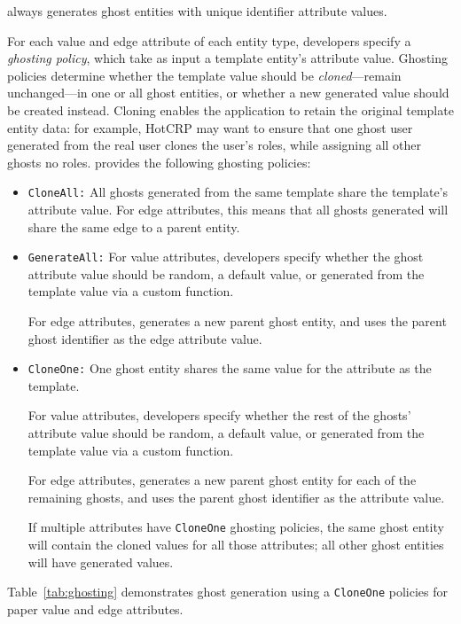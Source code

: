 \sys always generates ghost entities with unique identifier attribute values.

For each value and edge attribute of each entity type, developers specify a \emph{ghosting policy},
which take as input a template entity's attribute value.  Ghosting policies determine whether the
template value should be \emph{cloned}---remain unchanged---in one or all ghost entities, or whether
a new generated value should be created instead. Cloning enables the application to retain
the original template entity data: for example, HotCRP may want to ensure that one ghost user
generated from the real user clones the user's roles, while assigning all other ghosts no roles.
\sys provides the following ghosting policies:
\begin{itemize}
    \item \texttt{CloneAll:} All ghosts generated from the same template share the template's 
        attribute value. For edge attributes, this means that all ghosts generated will share the
        same edge to a parent entity.

    \item \texttt{GenerateAll:} 
        For value attributes, developers specify whether the ghost attribute value should be
        random, a default value, or generated from the template value via a custom function.
        
        For edge attributes, \sys generates a new parent ghost entity, and uses the parent ghost
        identifier as the edge attribute value.

    \item \texttt{CloneOne:} One ghost entity shares the same value for the attribute as the
        template. 
        
        For value attributes, developers specify whether the rest of the ghosts' attribute value should be
        random, a default value, or generated from the template value via a custom function.

        For edge attributes, \sys generates a new parent ghost entity for each of the remaining
        ghosts, and uses the parent ghost identifier as the attribute value.

        If multiple attributes have \texttt{CloneOne} ghosting policies, the same ghost entity will
        contain the cloned values for all those attributes; all other ghost entities will have
        generated values.
\end{itemize}
Table~\ref{tab:ghosting} demonstrates ghost generation using a \texttt{CloneOne} policies for paper
value and edge attributes.

